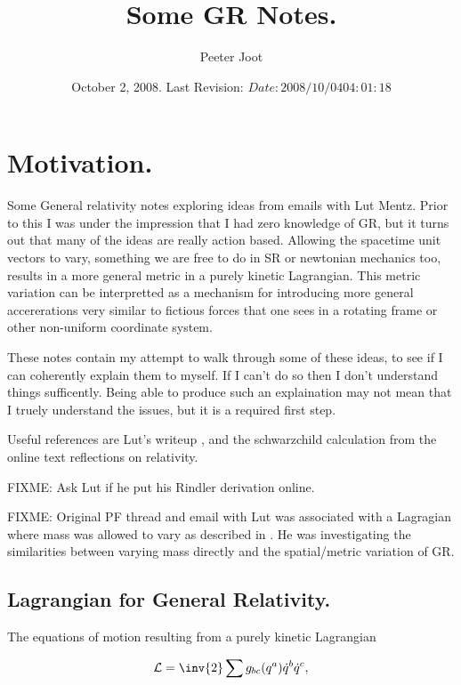 \documentclass{article}      %
\title{ Some GR Notes. } %
\author{Peeter Joot}         %
\date{ October 2, 2008.  Last Revision: $Date: 2008/10/04 04:01:18 $ } %
\newcommand{\LL}[0]{\mathcal{L}}
\newcommand{\qdot}[0]{\dot{q}}
\begin{document}

\maketitle{}

\tableofcontents

\section{ Motivation. }

Some General relativity notes exploring ideas from emails with Lut Mentz.
Prior to this I was under the impression that I had zero knowledge of GR,
but it turns out that many of the ideas are really action based. 
Allowing the spacetime unit vectors to vary, something we are free to
do in SR or newtonian mechanics too, results in a more 
general metric in a purely kinetic Lagrangian.  This metric variation
can be interpretted as a mechanism for introducing more general
accererations very similar to fictious forces that one sees in a
rotating frame or other non-uniform coordinate system.

These notes contain my attempt to walk through some of these ideas, to see
if I can coherently explain them to myself.  If I can't do so then I don't
understand things sufficently.  Being able to produce such an explaination
may not mean that I truely understand the issues, but it is a required
first step.

Useful references are Lut's writeup \cite{lutSchwarzChildRadial}, 
and the schwarzchild calculation \cite{mathpagesSchwarzChildRadial}
from the online text reflections on relativity.

FIXME: Ask Lut if he put his Rindler derivation online.

FIXME: Original PF thread and email with Lut was associated with 
a Lagragian where mass was allowed to vary as described in \cite{PJMassVary}.  He was
investigating the similarities between varying mass directly and the spatial/metric
variation of GR.

\subsection{ Lagrangian for General Relativity. }

The equations of motion resulting from a purely kinetic Lagrangian

\begin{equation}\label{eqn:keLagrangian}
\LL = \inv{2} \sum  g_{b c}(q^a) \qdot^b \qdot^c,
\end{equation}
\end{document}
